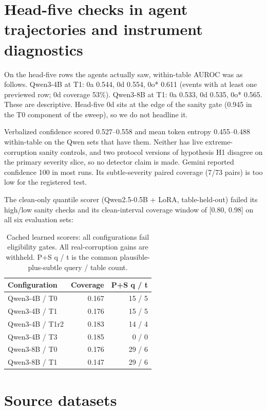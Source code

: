 \documentclass[letterpaper]{article}
\begin{document}
\section{Head-five checks in agent trajectories and instrument diagnostics}

On the head-five rows the agents actually saw, within-table AUROC was as follows. Qwen3-4B at T1: 0a 0.544, 0d 0.554, 0o* 0.611 (events with at least one previewed row; 0d coverage 53\%). Qwen3-8B at T1: 0a 0.533, 0d 0.535, 0o* 0.565. These are descriptive. Head-five 0d sits at the edge of the sanity gate (0.945 in the T0 component of the sweep), so we do not headline it.


Verbalized confidence scored 0.527--0.558 and mean token entropy 0.455--0.488 within-table on the Qwen sets that have them. Neither has live extreme-corruption sanity controls, and two protocol versions of hypothesis H1 disagree on the primary severity slice, so no detector claim is made. Gemini reported confidence 100 in most runs. Its subtle-severity paired coverage (7/73 pairs) is too low for the registered test.


The clean-only quantile scorer (Qwen2.5-0.5B + LoRA, table-held-out) failed its high/low sanity checks and its clean-interval coverage window of [0.80, 0.98] on all six evaluation sets:


\begin{table}[tbp]
\centering
{\small
\setlength{\tabcolsep}{3pt}
\begin{tabular}{lrr}
\toprule
Configuration & Coverage & P+S q / t \\ \midrule
Qwen3-4B / T0 & 0.167 & 15 / 5 \\
Qwen3-4B / T1 & 0.176 & 15 / 5 \\
Qwen3-4B / T1r2 & 0.183 & 14 / 4 \\
Qwen3-4B / T3 & 0.185 & 0 / 0 \\
Qwen3-8B / T0 & 0.176 & 29 / 6 \\
Qwen3-8B / T1 & 0.147 & 29 / 6 \\
\bottomrule
\end{tabular}
}

\caption{Cached learned scorers: all configurations fail eligibility gates. All real-corruption gains are withheld. P+S q / t is the common plausible-plus-subtle query / table count.}
\label{tab:scorer}
\end{table}

\section{Source datasets}
\end{document}
